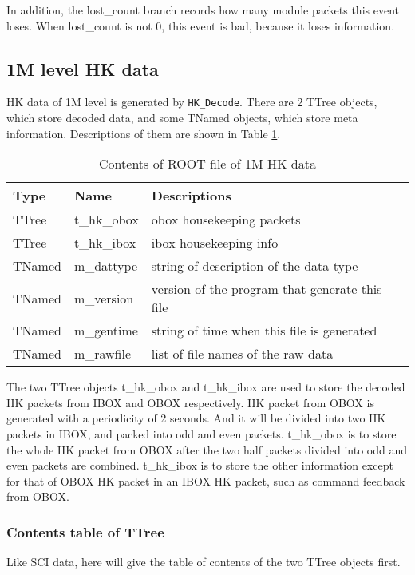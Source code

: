 \documentclass[a4paper, 12pt, onecolumn]{article}
\begin{document}
In addition, the lost\_count branch records how many module packets this event loses.
When lost\_count is not 0, this event is bad, because it loses information.

\newpage

\subsection{1M level HK data}
HK data of 1M level is generated by \texttt{HK\_Decode}. There are 2 TTree objects, which store decoded data,
and some TNamed objects, which store meta information. Descriptions of them are shown in Table \ref{tab:1m-hk}.

\begin{table}[htbp]
  \centering
  \caption{Contents of ROOT file of 1M HK data}\label{tab:1m-hk}
  \begin{tabular}{| l | l | l |} \hline
    \textbf{Type}    & \textbf{Name}     & \textbf{Descriptions}                  \\\hline
    TTree            & t\_hk\_obox       & obox housekeeping packets              \\\hline
    TTree            & t\_hk\_ibox       & ibox housekeeping info                 \\\hline
    TNamed           & m\_dattype        & string of description of the data type \\\hline
    TNamed           & m\_version        & version of the program that generate this file \\\hline
    TNamed           & m\_gentime        & string of time when this file is generated \\\hline
    TNamed           & m\_rawfile        & list of file names of the raw data \\\hline
  \end{tabular}
\end{table}

The two TTree objects t\_hk\_obox and t\_hk\_ibox are used to store the decoded HK packets from IBOX and OBOX respectively.
HK packet from OBOX is generated with a periodicity of 2 seconds. And it will be divided into two HK packets in IBOX,
and packed into odd and even packets. t\_hk\_obox is to store the whole HK packet from OBOX after the two half packets divided into odd and even packets are combined.
t\_hk\_ibox is to store the other information except for that of OBOX HK packet in an IBOX HK packet, such as command feedback from OBOX.

\subsubsection{Contents table of TTree}
Like SCI data, here will give the table of contents of the two TTree objects first.
\end{document}
